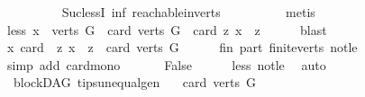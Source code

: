 \begin{isabellebody}
\ \ \ \ \ \ \ \ \isamarkupfalse%
\ Suc{\isacharunderscore}{\kern0pt}lessI\ inf\ reachable{}{\isacharunderscore}{\kern0pt}in{\isacharunderscore}{\kern0pt}verts{\isacharparenleft}{\kern0pt}{}{\isacharparenright}{\kern0pt}\isanewline
\ \ \ \ \ \ \ \ \isamarkupfalse%
\ {\isacharparenleft}{\kern0pt}metis{\isacharparenright}{\kern0pt}\ \ \isanewline
\ \ \ \ \isamarkupfalse%
\isanewline
\ \ \isamarkupfalse%
\isanewline
\ \ \isamarkupfalse%
\ \isamarkupfalse%
\ less{\isacharcolon}{\kern0pt}\ {\isachardoublequoteopen}{\isasymexists}x\ {\isasymin}\ verts\ G{\isachardot}{\kern0pt}\ \ card\ {\isacharparenleft}{\kern0pt}verts\ G{\isacharparenright}{\kern0pt}\ {\isacharless}{\kern0pt}\ card\ {\isacharbraceleft}{\kern0pt}z{\isachardot}{\kern0pt}\ x\ {\isasymrightarrow}\isactrlsup {\isacharplus}{\kern0pt}\ z{\isacharbraceright}{\kern0pt}{\isachardoublequoteclose}\isanewline
\ \ \ \ \isamarkupfalse%
\ blast\ \isanewline
\ \ \isamarkupfalse%
\isanewline
\ \ \isamarkupfalse%
\ {\isachardoublequoteopen}{\isasymforall}x{\isachardot}{\kern0pt}\ card\ \ {\isacharbraceleft}{\kern0pt}z{\isachardot}{\kern0pt}\ x\ {\isasymrightarrow}\isactrlsup {\isacharplus}{\kern0pt}\ z{\isacharbraceright}{\kern0pt}\ {\isasymle}\ card\ {\isacharparenleft}{\kern0pt}verts\ G{\isacharparenright}{\kern0pt}{\isachardoublequoteclose}\isanewline
\ \ \ \ \isamarkupfalse%
\ fin\ part\ finite{\isacharunderscore}{\kern0pt}verts\ not{\isacharunderscore}{\kern0pt}le\isanewline
\ \ \ \ \isamarkupfalse%
\ {\isacharparenleft}{\kern0pt}simp\ add{\isacharcolon}{\kern0pt}\ card{\isacharunderscore}{\kern0pt}mono{\isacharparenright}{\kern0pt}\ \isanewline
\ \ \isamarkupfalse%
\ \isamarkupfalse%
\ False\isanewline
\ \ \ \ \isamarkupfalse%
\ less\ not{\isacharunderscore}{\kern0pt}le\ \isamarkupfalse%
\ auto\ \isanewline
{}\isamarkupfalse%
%
\endisatagproof
{\isafoldproof}%
%
\isadelimproof
\isanewline
%
\endisadelimproof
\isanewline
{}\isamarkupfalse%
\ {\isacharparenleft}{\kern0pt}\ blockDAG{\isacharparenright}{\kern0pt}\ tips{\isacharunderscore}{\kern0pt}unequal{\isacharunderscore}{\kern0pt}gen{\isacharcolon}{\kern0pt}\isanewline
\ \ \ {\isachardoublequoteopen}card{\isacharparenleft}{\kern0pt}\ verts\ G{\isacharparenright}{\kern0pt}\ {\isachargreater}{\kern0pt}\ {}{\isachardoublequoteclose}\isanewline

\end{isabellebody}
